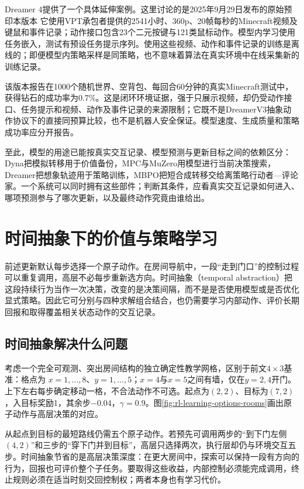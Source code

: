Dreamer 4提供了一个具体延伸案例。这里讨论的是2025年9月29日发布的原始预印本版本
它使用VPT承包者提供的2541小时、360p、20帧每秒的Minecraft视频及键鼠和事件记录；动作接口包含23个二元按键与121类鼠标动作。模型内学习使用任务嵌入，测试有预设任务提示序列。使用这些视频、动作和事件记录的训练是离线的；即便模型内策略采样是同策略，也不意味着算法在真实环境中在线采集新的训练记录。

该版本报告在1000个随机世界、空背包、每回合60分钟的真实Minecraft测试中，获得钻石的成功率为$0.7\%$。这是闭环环境证据，强于只展示视频，却仍受动作接口、任务提示和视频、动作及事件记录的来源限制；它既不是DreamerV3抽象动作协议下的直接同预算比较，也不是机器人安全保证。模型速度、生成质量和策略成功率应分开报告。

至此，模型的用途已能按真实交互记录、模型预测与更新目标之间的依赖区分：Dyna把模拟转移用于价值备份，MPC与MuZero用模型进行当前决策搜索，Dreamer把想象轨迹用于策略训练，MBPO把短合成转移交给离策略行动者—评论家。一个系统可以同时拥有这些部件；判断其条件，应看真实交互记录如何进入、哪项预测参与了哪次更新，以及最终动作究竟由谁给出。

\section{时间抽象下的价值与策略学习}
\label{sec:rl-learning-temporal-abstraction}

前述更新默认每步选择一个原子动作。在房间导航中，一段“走到门口”的控制过程可以重复调用，高层不必每步重新选方向。时间抽象（temporal abstraction）把这段持续行为当作一次决策，改变的是决策间隔，而不是是否使用模型或是否优化显式策略。因此它可分别与四种求解组合结合，也仍需要学习内部动作、评价长期回报和取得覆盖相关状态动作的交互记录。

\subsection{时间抽象解决什么问题}
\label{sec:rl-learning-temporal-purpose}

考虑一个完全可观测、突出房间结构的独立确定性教学网格，区别于前文$4\times3$基准：格点为
$x=1,\ldots,8$、$y=1,\ldots,5$；$x=4$与$x=5$之间有墙，仅在$y=2,4$开门。上下左右每步确定移动一格，不合法动作不可选。起点为$(2,2)$、目标为$(7,2)$，入目标奖励1，其余步$-0.04$，$\gamma=0.9$。图\ref{fig:rl-learning-options-rooms}画出原子动作与高层决策的对应。

从起点到目标的最短路线仍需五个原子动作。若预先可调用两步的“到下门左侧$(4,2)$”和三步的“穿下门并到目标”，高层只选择两次，执行层却仍与环境交互五步。时间抽象节省的是高层决策深度：在更大房间中，探索可以保持一段有方向的行为，回报也可评价整个子任务。要取得这些收益，内部控制必须能完成调用，终止规则必须在适当时刻交回控制权；两者本身也有学习代价。

